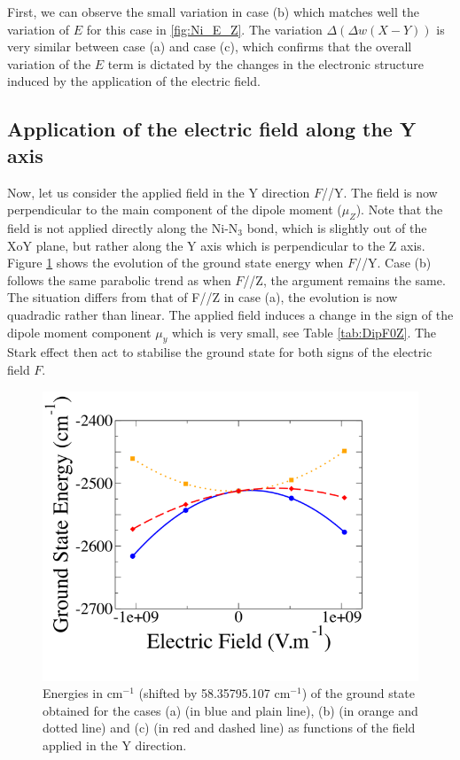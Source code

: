 \documentclass[12pt]{report}
\numberwithin{equation}{section}
\begin{document}
First, we can observe the small variation in case (b) which matches well the variation of $E$ for this case in \ref{fig:Ni_E_Z}.
The variation $\Delta (\Delta w(X-Y))$ is very similar between case (a) and case (c), which confirms that the overall variation of the $E$ term is dictated by the changes in the electronic structure induced by the application of the electric field.


\subsection{Application of the electric field along the Y axis}

Now, let us consider the applied field in the Y direction $F$//Y.
The field is now perpendicular to the main component of the dipole moment ($\mu_Z$).
Note that the field is not applied directly along the Ni-N$_3$ bond, which is slightly out of the XoY plane, but rather along the Y axis which is perpendicular to the Z axis.
Figure \ref{GSE_Y} shows the evolution of the ground state energy when $F$//Y.
Case (b) follows the same parabolic trend as when $F$//Z, the argument remains the same.
The situation differs from that of F//Z in case (a), the evolution is now quadradic rather than linear. 
The applied field induces a change in the sign of the dipole moment component $\mu_y$ which is very small, see Table \ref{tab:DipF0Z}.
The Stark effect then act to stabilise the ground state for both signs of the electric field $F$.


\begin{figure}[!ht]
    \centering
    \includegraphics[width=\textwidth]{Images/E_Y.png}
    \caption{Energies in cm$^{-1}$ (shifted by 58.35795.107 cm$^{-1}$) of the ground state obtained for the cases (a) (in blue and plain line), (b)
    (in orange and dotted line) and (c) (in red and dashed line) as functions of the field applied in the Y direction.}
    \label{GSE_Y}
\end{figure}
\end{document}

